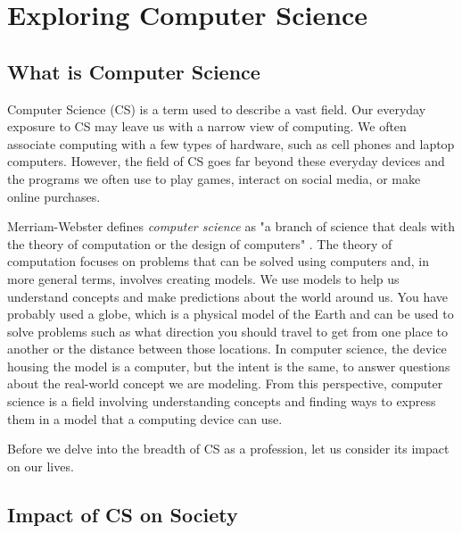 
\newcommand\Tstrut{\rule{0pt}{15pt}}  %

\chapter{Exploring Computer Science}

\section{What is Computer Science}

Computer Science (CS) is a term used to describe a vast field. Our everyday exposure to CS may leave us with a narrow view of computing. We often associate computing with a few types of hardware, such as cell phones and laptop computers. However, the field of CS goes far beyond these everyday devices and the programs we often use to play games, interact on social media, or make online purchases.

Merriam-Webster defines \emph{computer science} as "a branch of science that deals with the theory of computation or the design of computers" \parencite{noauthor_computer_nodate}. The theory of computation focuses on problems that can be solved using computers and, in more general terms, involves creating models. We use models to help us understand concepts and make predictions about the world around us. You have probably used a globe, which is a physical model of the Earth and can be used to solve problems such as what direction you should travel to get from one place to another or the distance between those locations. In computer science, the device housing the model is a computer, but the intent is the same, to answer questions about the real-world concept we are modeling. From this perspective, computer science is a field involving understanding concepts and finding ways to express them in a model that a computing device can use.

Before we delve into the breadth of CS as a profession, let us consider its impact on our lives.


\section{Impact of CS on Society}

